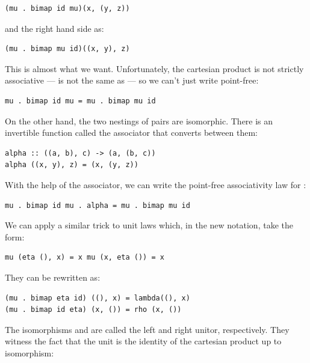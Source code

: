 \begin{Verbatim}[commandchars=\\\{\}]
(mu . bimap id mu)(x, (y, z))
\end{Verbatim}
and the right hand side as:

\begin{Verbatim}[commandchars=\\\{\}]
(mu . bimap mu id)((x, y), z)
\end{Verbatim}
This is almost what we want. Unfortunately, the cartesian product is not
strictly associative ---  is not the same as
 --- so we can't just write point-free:

\begin{Verbatim}[commandchars=\\\{\}]
mu . bimap id mu = mu . bimap mu id
\end{Verbatim}
On the other hand, the two nestings of pairs are isomorphic. There is an
invertible function called the associator that converts between them:

\begin{Verbatim}[commandchars=\\\{\}]
alpha :: ((a, b), c) -> (a, (b, c))
alpha ((x, y), z) = (x, (y, z))
\end{Verbatim}
With the help of the associator, we can write the point-free
associativity law for :

\begin{Verbatim}[commandchars=\\\{\}]
mu . bimap id mu . alpha = mu . bimap mu id
\end{Verbatim}
We can apply a similar trick to unit laws which, in the new notation,
take the form:

\begin{Verbatim}[commandchars=\\\{\}]
mu (eta (), x) = x mu (x, eta ()) = x
\end{Verbatim}
They can be rewritten as:

\begin{Verbatim}[commandchars=\\\{\}]
(mu . bimap eta id) ((), x) = lambda((), x)
(mu . bimap id eta) (x, ()) = rho (x, ())
\end{Verbatim}
The isomorphisms  and  are called the left
and right unitor, respectively. They witness the fact that the unit
\code{()} is the identity of the cartesian product up to isomorphism:

